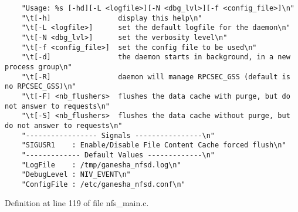 \footnotesize\begin{verbatim} 
    "Usage: %s [-hd][-L <logfile>][-N <dbg_lvl>][-f <config_file>]\n"
    "\t[-h]                display this help\n"
    "\t[-L <logfile>]      set the default logfile for the daemon\n"
    "\t[-N <dbg_lvl>]      set the verbosity level\n"
    "\t[-f <config_file>]  set the config file to be used\n"
    "\t[-d]                the daemon starts in background, in a new process group\n"
    "\t[-R]                daemon will manage RPCSEC_GSS (default is no RPCSEC_GSS)\n"
    "\t[-F] <nb_flushers>  flushes the data cache with purge, but do not answer to requests\n"
    "\t[-S] <nb_flushers>  flushes the data cache without purge, but do not answer to requests\n"
    "----------------- Signals ----------------\n"
    "SIGUSR1    : Enable/Disable File Content Cache forced flush\n" 
    "------------- Default Values -------------\n"
    "LogFile    : /tmp/ganesha_nfsd.log\n"
    "DebugLevel : NIV_EVENT\n"
    "ConfigFile : /etc/ganesha_nfsd.conf\n"
\end{verbatim}\normalsize 


Definition at line 119 of file nfs\_\-main.c.